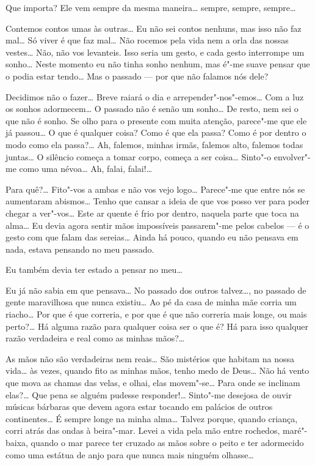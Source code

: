  Que importa? Ele vem sempre da
mesma maneira\ldots{} sempre, sempre, sempre\ldots{}

\hfill{} 

 Contemos contos umas às outras\ldots{}
Eu não sei contos nenhuns,
mas isso não faz mal\ldots{} Só viver
é que faz mal\ldots{} Não rocemos pela vida
nem a orla das nossas vestes\ldots{} Não, não vos
levanteis. Isso seria um gesto, e cada gesto
interrompe um sonho\ldots{} Neste momento eu não tinha
sonho nenhum, mas é"-me suave pensar que o podia
estar tendo\ldots{} Mas o passado --- por que não falamos nós dele?

 Decidimos não o fazer\ldots{}
Breve raiará o dia e
arrepender"-nos"-emos\ldots{} Com a luz os
sonhos adormecem\ldots{} O passado
não é senão um sonho\ldots{} De resto, nem sei o que não é sonho.
Se olho para o presente com muita atenção, parece"-me que ele já
passou\ldots{} O que é qualquer coisa? Como é que ela passa?
Como é por dentro o modo como ela passa?\ldots{}
Ah, falemos, minhas irmãs, falemos			\EP[]
alto, falemos todas juntas\ldots{} 
O silêncio começa a tomar corpo, começa a
ser coisa\ldots{} Sinto"-o envolver"-me
como uma névoa\ldots{} Ah, falai, falai!\ldots{}

 Para quê?\ldots{} Fito"-vos a
ambas e não vos vejo logo\ldots{}
Parece"-me que entre nós se aumentaram abismos\ldots{}
Tenho que cansar a ideia de que vos posso ver para poder
chegar a ver"-vos\ldots{} Este ar quente é frio por dentro,
naquela parte que toca na alma\ldots{} Eu devia
agora sentir mãos impossíveis passarem"-me pelos
cabelos --- é o gesto com que falam das sereias\ldots{} 
Ainda há pouco, quando eu não pensava em nada, estava pensando
no meu passado. 

 Eu também devia ter estado a pensar no meu\ldots{}

 Eu já não sabia em que pensava\ldots{} 
No passado dos outros talvez\ldots{}, no passado de
gente maravilhosa que nunca existiu\ldots{} Ao pé
da casa de minha mãe corria um riacho\ldots{} Por que
é que correria, e por que é que não correria mais longe,
ou mais perto?\ldots{} Há alguma razão
para qualquer coisa ser o que é? Há para isso qualquer
razão verdadeira e real como as minhas mãos?\ldots{}

 As mãos não são verdadeiras nem reais\ldots{}
São mistérios que
habitam na nossa vida\ldots{} às vezes, quando fito 
as minhas mãos, tenho
medo de Deus\ldots{} Não há vento que mova as
chamas das velas, e olhai,
elas movem"-se\ldots{} Para onde se inclinam
elas?\ldots{} Que pena se alguém
pudesse responder!\ldots{} Sinto"-me desejosa
de ouvir músicas bárbaras que
devem agora estar tocando em palácios de
outros continentes\ldots{} É sempre
longe na minha alma\ldots{} Talvez porque,
quando criança, corri atrás das
ondas à beira"-mar. Levei a vida pela mão entre rochedos,
maré"-baixa, quando o mar parece ter cruzado as mãos
sobre o peito e
ter adormecido como uma estátua de anjo para que 
nunca mais ninguém olhasse\ldots{}

